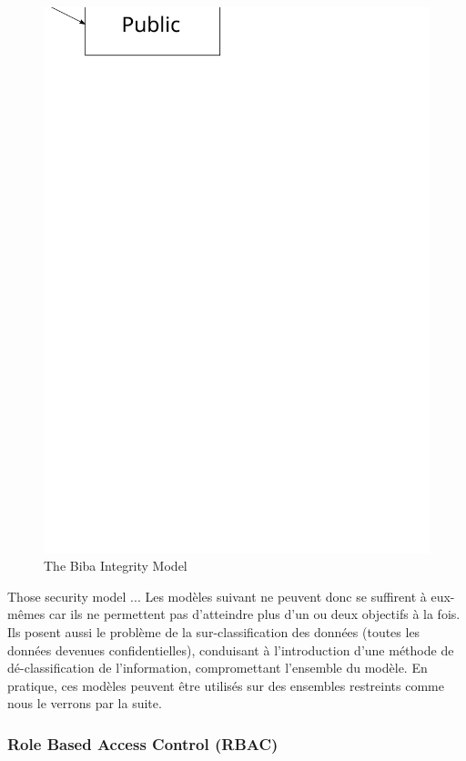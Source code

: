 \documentclass[pdftex,a4paper,titlepage,11pt]{article}
\begin{document}
\begin{figure}[h]
	\centering
	\includegraphics[scale=0.5]{biba}
	\caption{The Biba Integrity Model}
\end{figure}

\bigskip

Those security model ...
Les modèles suivant ne peuvent donc se suffirent à eux-mêmes car ils ne
permettent pas d'atteindre plus d'un ou deux objectifs à la fois. Ils posent
aussi le problème de la sur-classification des données (toutes les données
devenues confidentielles), conduisant à l'introduction d'une méthode de
dé-classification de l'information, compromettant l'ensemble du modèle.
En pratique, ces modèles peuvent être utilisés sur des ensembles restreints
comme nous le verrons par la suite.

\subsubsection{Role Based Access Control (RBAC)}
\end{document}
